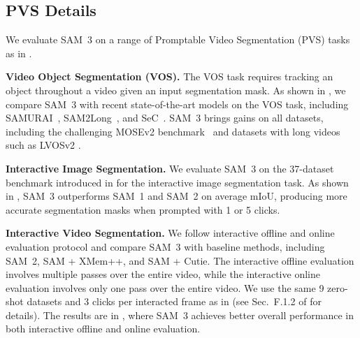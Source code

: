 \documentclass[]{fairmeta}
\newcommand{\samone}{SAM~1\xspace}
\newcommand{\samtwo}{SAM~2\xspace}
\newcommand{\model}{SAM~3\xspace}
\renewcommand{\paragraph}[1]{%
	\noindent\textbf{#1.}\noindent\xspace%
}
\begin{document}
\subsection{PVS Details}
\label{app:pvs_details}
We evaluate \model on a range of Promptable Video Segmentation (PVS) tasks as in \cite{sam2}.

\paragraph{Video Object Segmentation (VOS)} The VOS task requires tracking an object throughout a video given an input segmentation mask. As shown in , we compare \model with recent state-of-the-art models on the VOS task, including SAMURAI~\citep{yang2024samurai}, SAM2Long~\citep{ding2024sam2long}, and SeC~\citep{zhang2025sec}. \model brings gains on all datasets, including the challenging MOSEv2 benchmark~\citep{ding2025mosev2} and datasets with long videos such as LVOSv2 \citep{hong2024lvos}.

\paragraph{Interactive Image Segmentation} We evaluate \model on the 37-dataset benchmark introduced in \cite{sam2} for the interactive image segmentation task. As shown in , \model outperforms \samone and \samtwo on average $\mathrm{mIoU}$, producing more accurate segmentation masks when prompted with 1 or 5 clicks.

\paragraph{Interactive Video Segmentation} We follow interactive offline and online evaluation protocol \cite{sam2} and compare \model with baseline methods, including \samtwo, SAM + XMem++, and SAM + Cutie. The interactive offline evaluation involves multiple passes over the entire video, while the interactive online evaluation involves only one pass over the entire video. We use the same 9 zero-shot datasets and 3 clicks per interacted frame as in \cite{sam2} (see Sec.~F.1.2 of \cite{sam2} for details). The results are  in , where \model achieves better overall performance in both interactive offline and online evaluation.
\end{document}
